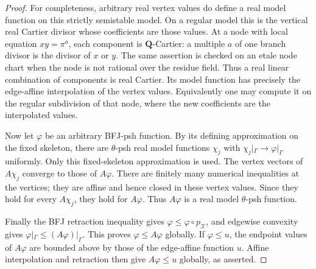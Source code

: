 \begin{proof}
For completeness, arbitrary real vertex values do define a real
model function on this strictly semistable model.  On a regular
model this is the vertical real Cartier divisor whose coefficients
are those values.  At a node with local equation \(xy=\pi^a\),
each component is \(\mathbf Q\)-Cartier: a multiple \(a\) of
one branch divisor is the divisor of \(x\) or \(y\).
The same assertion is checked on an etale node chart when the node
is not rational over the residue field.  Thus a real linear
combination of components is real Cartier.  Its model function
has precisely the edge-affine interpolation of the vertex values.
Equivalently one may compute it on the regular subdivision of that
node, where the new coefficients are the interpolated values.

Now let \(\varphi\) be an arbitrary BFJ-psh function.  By its
defining approximation on the fixed skeleton, there are
\(\theta\)-psh real model functions \(\chi_j\) with
\(\chi_j|_\Gamma\to\varphi|_\Gamma\) uniformly.  Only this
fixed-skeleton approximation is used.  The vertex vectors of
\(A\chi_j\) converge to those of \(A\varphi\).
There are finitely many numerical inequalities at the vertices;
they are affine and hence closed in these vertex values.  Since
they hold for every \(A\chi_j\), they hold for \(A\varphi\).
Thus \(A\varphi\) is a real model \(\theta\)-psh function.

Finally the BFJ retraction inequality gives
\(\varphi\leq\varphi\circ p_{\mathcal X}\), and edgewise
convexity gives \(\varphi|_\Gamma\leq(A\varphi)|_\Gamma\).
This proves \(\varphi\leq A\varphi\) globally.  If
\(\varphi\leq u\), the endpoint values of \(A\varphi\) are
bounded above by those of the edge-affine function \(u\).
Affine interpolation and retraction then give \(A\varphi\leq u\)
globally, as asserted.
\end{proof}
